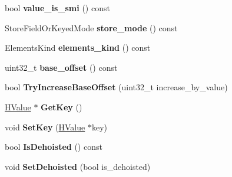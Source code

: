 \begin{DoxyCompactItemize}
\item 
\hypertarget{classv8_1_1internal_1_1_v8___f_i_n_a_l_a5b1c50e1f2ce492d7f363a7c71d58c14}{}bool {\bfseries value\+\_\+is\+\_\+smi} () const \label{classv8_1_1internal_1_1_v8___f_i_n_a_l_a5b1c50e1f2ce492d7f363a7c71d58c14}

\item 
\hypertarget{classv8_1_1internal_1_1_v8___f_i_n_a_l_a9b03eb03a5d3915ded38791d8ec8d81c}{}Store\+Field\+Or\+Keyed\+Mode {\bfseries store\+\_\+mode} () const \label{classv8_1_1internal_1_1_v8___f_i_n_a_l_a9b03eb03a5d3915ded38791d8ec8d81c}

\item 
\hypertarget{classv8_1_1internal_1_1_v8___f_i_n_a_l_add83d3b1af43467fa5b1280206676eb7}{}Elements\+Kind {\bfseries elements\+\_\+kind} () const \label{classv8_1_1internal_1_1_v8___f_i_n_a_l_add83d3b1af43467fa5b1280206676eb7}

\item 
\hypertarget{classv8_1_1internal_1_1_v8___f_i_n_a_l_a00906b3ab3463ca74c5999407333630a}{}uint32\+\_\+t {\bfseries base\+\_\+offset} () const \label{classv8_1_1internal_1_1_v8___f_i_n_a_l_a00906b3ab3463ca74c5999407333630a}

\item 
\hypertarget{classv8_1_1internal_1_1_v8___f_i_n_a_l_a943c0223511d61d641b36e93ec188f3a}{}bool {\bfseries Try\+Increase\+Base\+Offset} (uint32\+\_\+t increase\+\_\+by\+\_\+value)\label{classv8_1_1internal_1_1_v8___f_i_n_a_l_a943c0223511d61d641b36e93ec188f3a}

\item 
\hypertarget{classv8_1_1internal_1_1_v8___f_i_n_a_l_a123feb67fadfb09b70c9b6898220c081}{}\hyperlink{classv8_1_1internal_1_1_h_value}{H\+Value} $\ast$ {\bfseries Get\+Key} ()\label{classv8_1_1internal_1_1_v8___f_i_n_a_l_a123feb67fadfb09b70c9b6898220c081}

\item 
\hypertarget{classv8_1_1internal_1_1_v8___f_i_n_a_l_a358155257d203c4b708eab865573eb69}{}void {\bfseries Set\+Key} (\hyperlink{classv8_1_1internal_1_1_h_value}{H\+Value} $\ast$key)\label{classv8_1_1internal_1_1_v8___f_i_n_a_l_a358155257d203c4b708eab865573eb69}

\item 
\hypertarget{classv8_1_1internal_1_1_v8___f_i_n_a_l_a4d58e84a5f0887aab90493145d6ea268}{}bool {\bfseries Is\+Dehoisted} () const \label{classv8_1_1internal_1_1_v8___f_i_n_a_l_a4d58e84a5f0887aab90493145d6ea268}

\item 
\hypertarget{classv8_1_1internal_1_1_v8___f_i_n_a_l_a64724188651b4553702aba14841ba8c9}{}void {\bfseries Set\+Dehoisted} (bool is\+\_\+dehoisted)\label{classv8_1_1internal_1_1_v8___f_i_n_a_l_a64724188651b4553702aba14841ba8c9}


\end{DoxyCompactItemize}
